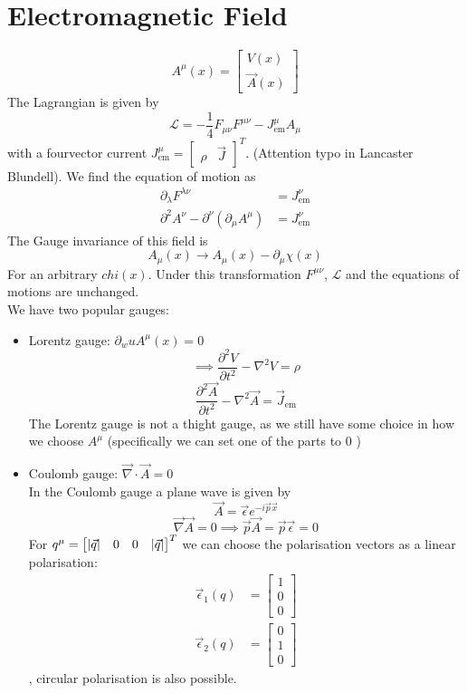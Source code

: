 \documentclass{report}
\begin{document}
\section{Electromagnetic Field}
\[
	A^\mu(x) = \begin{bmatrix} V(x) \\ \vec{A}(x) \end{bmatrix} 
\] The Lagrangian is given by \[
\mathcal{L} = -\frac{1}{4} F_{\mu \nu}F^{\mu \nu} - J_{\text{em}}^\mu A_\mu
\] with a fourvector current $J_{\text{em}}^\mu = \begin{bmatrix} \rho & \vec{J} \end{bmatrix}^T $. (Attention typo in Lancaster Blundell). We find the equation of motion as
\begin{align*}
	\partial_\lambda F^{\lambda\nu} &= J_{\text{em}}^\nu \\
	\partial^2 A^\nu - \partial^\nu \left( \partial_\mu A^\mu  \right) &= J_{\text{em}}^\nu  
\end{align*}
The Gauge invariance of this field is \[
	A_\mu(x) \to A_\mu(x) - \partial_\mu \chi(x)
\] For an arbitrary $chi(x)$. Under this transformation $F^{\mu \nu}$, $\mathcal{L}$ and the equations of motions are unchanged.\\
We have two popular gauges:
\begin{itemize}
	\item Lorentz gauge: $\partial_wu A^\mu(x) = 0 $ \[
	\implies \frac{\partial^2 V}{\partial t^2} - \nabla^2 V = \rho
        \] \[
	\frac{\partial^2 \vec{A}}{\partial t^2} - \nabla^2 \vec{A} = \vec{J}_{\text{em}} 
\] The Lorentz gauge is not a thight gauge, as we still have some choice in how we choose $A^\mu$ (specifically we can set one of the parts to $0$ ) 
\item Coulomb gauge: $\vec{\nabla } \cdot \vec{A} = 0$\\
	In the Coulomb gauge a plane wave is given by \[
		\vec{A} = \vec{\epsilon} e^{-i\vec{p} \vec{x}}
	\] \[
	\vec{\nabla } \vec{A} = 0 \implies \vec{p} \vec{A} = \vec{p} \vec{\epsilon} = 0
	\] For $q^\mu = \begin{bmatrix} \abs{\vec{q}} & 0 & 0 & \abs{\vec{q}} \end{bmatrix}^T$ we can choose the polarisation vectors as a linear polarisation:
	\begin{align*}
		\vec{\epsilon}_1(q) &= \begin{bmatrix} 1 \\ 0 \\ 0 \end{bmatrix} \\
		\vec{\epsilon}_2(q) &= \begin{bmatrix} 0 \\ 1 \\ 0 \end{bmatrix} 
	\end{align*}, circular polarisation is also possible.
\end{itemize}
\end{document}
